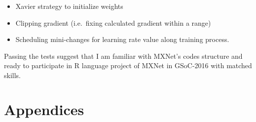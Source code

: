 \documentclass[]{article}
\providecommand{\tightlist}{%
  \setlength{\itemsep}{0pt}\setlength{\parskip}{0pt}}
\begin{document}
\begin{itemize}
\tightlist
\item
  Xavier strategy to initialize weights
\item
  Clipping gradient (i.e.~fixing calculated gradient within a range)
\item
  Scheduling mini-changes for learning rate value along training
  process.
\end{itemize}

Passing the tests suggest that I am familiar with MXNet's codes
structure and ready to participate in R language project of MXNet in
GSoC-2016 with matched skills.

\section*{Appendices}\label{appendix}
\end{document}
